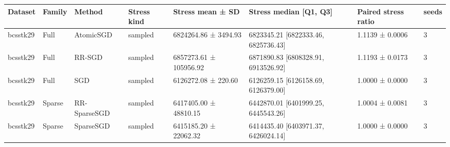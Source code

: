 \begin{tabular}{llllllll}
\hline
Dataset & Family & Method & Stress kind & Stress mean ± SD & Stress median [Q1, Q3] & Paired stress ratio & seeds \\
\hline
bcsstk29 & Full & AtomicSGD & sampled & 6824264.86 ± 3494.93 & 6823345.21 [6822333.46, 6825736.43] & 1.1139 ± 0.0006 & 3 \\
bcsstk29 & Full & RR-SGD & sampled & 6857273.61 ± 105956.92 & 6871890.83 [6808328.91, 6913526.92] & 1.1193 ± 0.0173 & 3 \\
bcsstk29 & Full & SGD & sampled & 6126272.08 ± 220.60 & 6126259.15 [6126158.69, 6126379.00] & 1.0000 ± 0.0000 & 3 \\
bcsstk29 & Sparse & RR-SparseSGD & sampled & 6417405.00 ± 48810.15 & 6442870.01 [6401999.25, 6445543.26] & 1.0004 ± 0.0081 & 3 \\
bcsstk29 & Sparse & SparseSGD & sampled & 6415185.20 ± 22062.32 & 6414435.40 [6403971.37, 6426024.14] & 1.0000 ± 0.0000 & 3 \\
\hline
\end{tabular}
